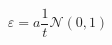\begin{equation}
    \varepsilon = a \frac{1}{t} \mathcal{N}(0, 1)
    \label{eq:noise}
\end{equation}
